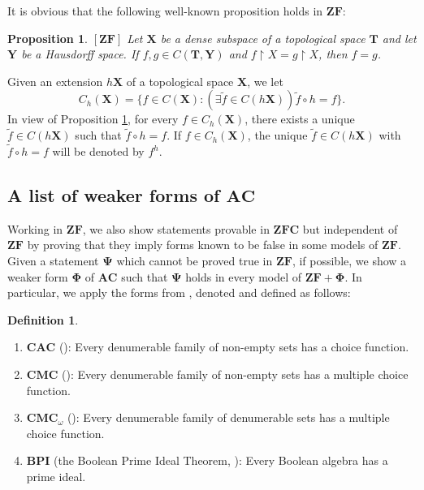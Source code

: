 \documentclass[12pt,twoside,leqno]{article}
\theoremstyle{plain}
\newtheorem{proposition}[theorem]{Proposition}
\theoremstyle{definition}
\newtheorem{definition}[theorem]{Definition}
\theoremstyle{remark}
\begin{document}
It is obvious that the following well-known proposition holds in $\mathbf{ZF}$:
\begin{proposition}
	\label{s1:p12}
	$[\mathbf{ZF}]$ Let $\mathbf{X}$ be a dense subspace of a topological space $\mathbf{T}$ and let $\mathbf{Y}$  be a Hausdorff space. If $f,g\in C(\mathbf{T},\mathbf{Y})$ and $f\upharpoonright X=g\upharpoonright X$, then $f=g$.
\end{proposition}

Given an extension $h\mathbf{X}$ of a topological space $\mathbf{X}$, we let 
$$C_{h}(\mathbf{X})=\{ f\in C(\mathbf{X}): (\exists \tilde{f}\in C(h\mathbf{X})) \tilde{f}\circ h= f\}.$$
In view of Proposition \ref{s1:p12}, for every $f\in C_h(\mathbf{X})$, there exists a unique $\tilde{f}\in C(h\mathbf{X})$ such that $\tilde{f}\circ h=f$. If $f\in C_h(\mathbf{X})$, the unique $\tilde{f}\in C(h\mathbf{X})$ with $\tilde{f}\circ h=f$ will be denoted by $f^h$. 

\subsection{A list of weaker forms of $\mathbf{AC}$ }
\label{s1.3}

Working in $\mathbf{ZF}$, we also show statements provable in $\mathbf{ZFC}$ but independent of $\mathbf{ZF}$ by proving that they imply forms known to be false in some models of $\mathbf{ZF}$.  Given a statement $\mathbf{\Psi}$ which cannot be proved true in $\mathbf{ZF}$, if possible, we show a weaker form  $\mathbf{\Phi}$ of $\mathbf{AC}$ such that $\mathbf{\Psi}$ holds in every model of $\mathbf{ZF+\Phi}$. In particular, we apply the forms from \cite{hr}, denoted and  defined as follows:

\begin{definition}
	\label{s1:d13}
	\begin{enumerate}
		\item $\mathbf{CAC}$  (\cite[Form 8]{hr}): Every denumerable family of non-empty sets has a choice function.
		
		\item $\mathbf{CMC}$ (\cite[Form 126]{hr}): Every denumerable family of non-empty sets has a multiple choice function.
		
		\item $\mathbf{CMC}_{\omega}$ (\cite[Form 350]{hr}): Every denumerable family of denumerable sets has a multiple choice function.	
		
		\item $\mathbf{BPI}$ (the Boolean Prime Ideal Theorem, \cite[Form 14]{hr}): Every Boolean algebra has a prime ideal.
	\end{enumerate}
\end{definition}
\end{document}
